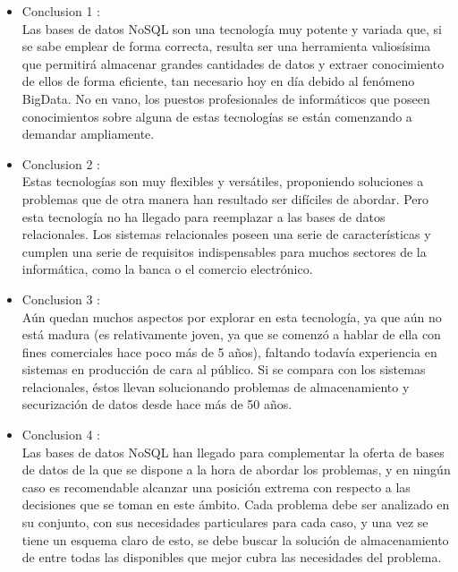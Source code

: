 \documentclass[preprint,12pt]{elsarticle}
\begin{document}
\begin{itemize}

\item Conclusion 1 : \\
Las bases de datos NoSQL son una tecnología muy potente y variada que, si se sabe
emplear de forma correcta, resulta ser una herramienta valiosísima que permitirá
almacenar grandes cantidades de datos y extraer conocimiento de ellos de forma
eficiente, tan necesario hoy en día debido al fenómeno BigData. No en vano, los puestos
profesionales de informáticos que poseen conocimientos sobre alguna de estas
tecnologías se están comenzando a demandar ampliamente.\\

\item Conclusion 2 : \\ 
Estas tecnologías son muy flexibles y versátiles, proponiendo soluciones a problemas
que de otra manera han resultado ser difíciles de abordar. Pero esta tecnología no ha
llegado para reemplazar a las bases de datos relacionales. Los sistemas relacionales
poseen una serie de características y cumplen una serie de requisitos indispensables para
muchos sectores de la informática, como la banca o el comercio electrónico. \\

\item Conclusion 3 : \\ 
Aún quedan muchos aspectos por explorar en esta tecnología, ya que aún no está
madura (es relativamente joven, ya que se comenzó a hablar de ella con fines
comerciales hace poco más de 5 años), faltando todavía experiencia en sistemas en
producción de cara al público. Si se compara con los sistemas relacionales, éstos llevan
solucionando problemas de almacenamiento y securización de datos desde hace más de
50 años.\\

\item Conclusion 4 : \\ 
Las bases de datos NoSQL han llegado para complementar la oferta de bases de datos
de la que se dispone a la hora de abordar los problemas, y en ningún caso es
recomendable alcanzar una posición extrema con respecto a las decisiones que se toman
en este ámbito. Cada problema debe ser analizado en su conjunto, con sus necesidades
particulares para cada caso, y una vez se tiene un esquema claro de esto, se debe buscar
la solución de almacenamiento de entre todas las disponibles que mejor cubra las
necesidades del problema.




\end{itemize}


	
	\newpage
	
		 
	
	
\end{document}
